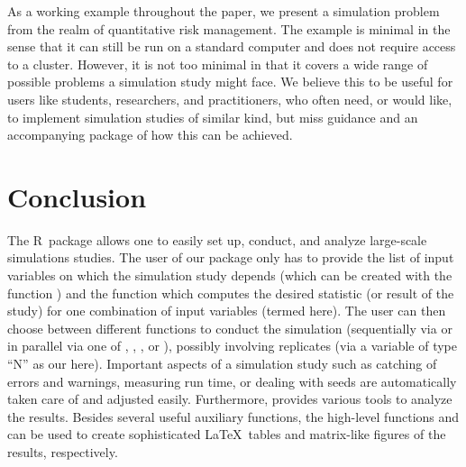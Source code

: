 \documentclass[article]{jss}
\newcommand*{\R}{\textsf{R}}
\theoremstyle{mythmstyle}%
\begin{document}
As a working example throughout the paper, we present a simulation problem from
the realm of quantitative risk management. The example is minimal in the sense
that it can still be run on a standard computer and does not require access to a
cluster. However, it is not too minimal in that it covers a wide range of possible
problems a simulation study might face. We believe this to be useful for users
like students, researchers, and practitioners, who often need, or would like,
to implement simulation studies of similar kind, but miss guidance and an
accompanying package of how this can be achieved.





\clearpage%









\ifTimes\fi

\section{Conclusion}\label{sec:conclusion}
The \R\ package  allows one to easily set up, conduct, and
analyze large-scale simulations studies. The user of our package only has to
provide the list of input variables on which the simulation study depends (which
can be created with the function ) and the function which
computes the desired statistic (or result of the study) for one combination of input variables
(termed  here). The user can then choose between different functions
to conduct the simulation (sequentially via  or in parallel via
one of , , , or
), possibly involving replicates (via a variable of type
``N'' as our  here). Important aspects of a simulation study such as
catching of errors and warnings, measuring run time, or dealing with seeds are
automatically taken care of and adjusted easily. Furthermore,  provides
various tools to analyze the results. Besides several useful auxiliary functions,
the high-level functions  and  can be used to
create sophisticated \LaTeX\ tables and matrix-like figures of the results, respectively.
\end{document}
